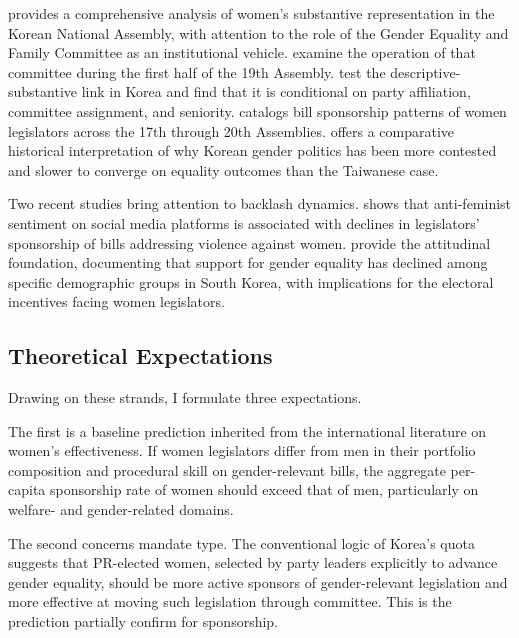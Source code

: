 \documentclass[11pt]{article}
\begin{document}
\citet{shin2022} provides a comprehensive analysis of women's substantive representation in the Korean National Assembly, with attention to the role of the Gender Equality and Family Committee as an institutional vehicle. \citet{yunParkJung2016} examine the operation of that committee during the first half of the 19th Assembly. \citet{leeLee2020} test the descriptive-substantive link in Korea and find that it is conditional on party affiliation, committee assignment, and seniority. \citet{jeong2019} catalogs bill sponsorship patterns of women legislators across the 17th through 20th Assemblies. \citet{go2025} offers a comparative historical interpretation of why Korean gender politics has been more contested and slower to converge on equality outcomes than the Taiwanese case.

Two recent studies bring attention to backlash dynamics. \citet{woo2023} shows that anti-feminist sentiment on social media platforms is associated with declines in legislators' sponsorship of bills addressing violence against women. \citet{kimLeeKang2025} provide the attitudinal foundation, documenting that support for gender equality has declined among specific demographic groups in South Korea, with implications for the electoral incentives facing women legislators.

\subsection{Theoretical Expectations}

Drawing on these strands, I formulate three expectations.

The first is a baseline prediction inherited from the international literature on women's effectiveness. If women legislators differ from men in their portfolio composition and procedural skill on gender-relevant bills, the aggregate per-capita sponsorship rate of women should exceed that of men, particularly on welfare- and gender-related domains.

The second concerns mandate type. The conventional logic of Korea's quota suggests that PR-elected women, selected by party leaders explicitly to advance gender equality, should be more active sponsors of gender-relevant legislation and more effective at moving such legislation through committee. This is the prediction \citet{kweonRyan2021} partially confirm for sponsorship.
\end{document}
